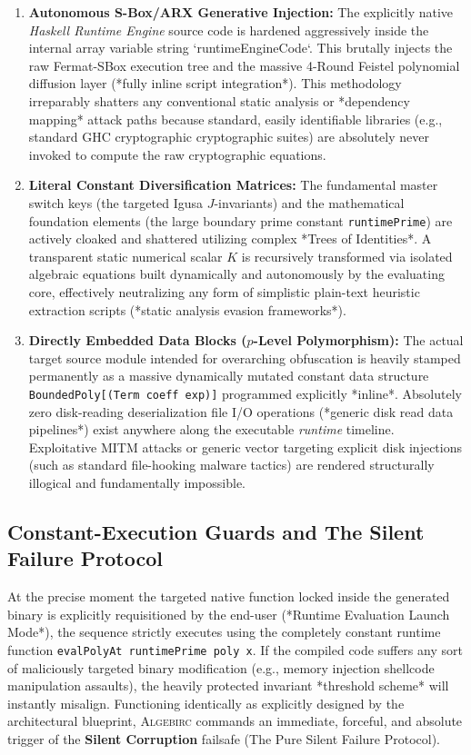 \begin{enumerate}
    \item \textbf{Autonomous S-Box/ARX Generative Injection:} 
    The explicitly native \textsl{Haskell Runtime Engine} source code is hardened aggressively inside the internal array variable string `runtimeEngineCode`. This brutally injects the raw Fermat-SBox execution tree and the massive 4-Round Feistel polynomial diffusion layer (*fully inline script integration*). This methodology irreparably shatters any conventional static analysis or *dependency mapping* attack paths because standard, easily identifiable libraries (e.g., standard GHC cryptographic cryptographic suites) are absolutely never invoked to compute the raw cryptographic equations.
    
    \item \textbf{Literal Constant Diversification Matrices:} 
    The fundamental master switch keys (the targeted Igusa $J$-invariants) and the mathematical foundation elements (the large boundary prime constant \texttt{runtimePrime}) are actively cloaked and shattered utilizing complex *Trees of Identities*. A transparent static numerical scalar $K$ is recursively transformed via isolated algebraic equations built dynamically and autonomously by the evaluating core, effectively neutralizing any form of simplistic plain-text heuristic extraction scripts (*static analysis evasion frameworks*).
    
    \item \textbf{Directly Embedded Data Blocks ($p$-Level Polymorphism):} 
    The actual target source module intended for overarching obfuscation is heavily stamped permanently as a massive dynamically mutated constant data structure \texttt{BoundedPoly[(Term coeff exp)]} programmed explicitly *inline*. Absolutely zero disk-reading deserialization file I/O operations (*generic disk read data pipelines*) exist anywhere along the executable \textit{runtime} timeline. Exploitative MITM attacks or generic vector targeting explicit disk injections (such as standard file-hooking malware tactics) are rendered structurally illogical and fundamentally impossible.
\end{enumerate}

\subsection{Constant-Execution Guards and The Silent Failure Protocol}
At the precise moment the targeted native function locked inside the generated binary is explicitly requisitioned by the end-user (*Runtime Evaluation Launch Mode*), the sequence strictly executes using the completely constant runtime function \texttt{evalPolyAt runtimePrime poly x}. If the compiled code suffers any sort of maliciously targeted binary modification (e.g., memory injection shellcode manipulation assaults), the heavily protected invariant *threshold scheme* will instantly misalign. Functioning identically as explicitly designed by the architectural blueprint, \textsc{Algebirc} commands an immediate, forceful, and absolute trigger of the \textbf{Silent Corruption} failsafe (The Pure Silent Failure Protocol). 

